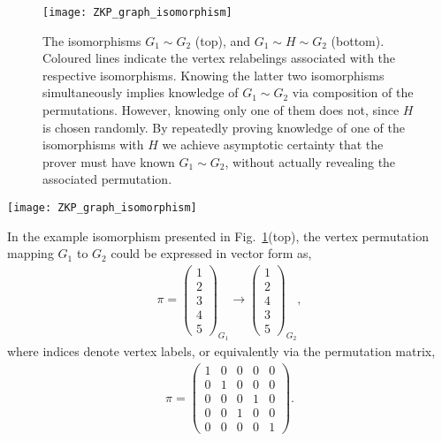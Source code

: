 \pubmode
\begin{figure}[!htpb]
	\texttt{[image: ZKP\_graph\_isomorphism]}
\captionspacefig \caption{The isomorphisms \mbox{$G_1\sim G_2$} (top), and \mbox{$G_1\sim H\sim G_2$} (bottom). Coloured lines indicate the vertex relabelings associated with the respective isomorphisms. Knowing the latter two isomorphisms simultaneously implies knowledge of \mbox{$G_1\sim G_2$} via composition of the permutations. However, knowing only one of them does not, since $H$ is chosen randomly. By repeatedly proving knowledge of one of the isomorphisms with $H$ we achieve asymptotic certainty that the prover must have known \mbox{$G_1\sim G_2$}, without actually revealing the associated permutation.}\label{fig:ZKP_graph}
\end{figure}
\else
\begin{figure*}[!htpb]
	\texttt{[image: ZKP\_graph\_isomorphism]}
\captionspacefig \caption{The isomorphisms \mbox{$G_1\sim G_2$} (top), and \mbox{$G_1\sim H\sim G_2$} (bottom). Coloured lines indicate the vertex relabelings associated with the respective isomorphisms. Knowing the latter two isomorphisms simultaneously implies knowledge of \mbox{$G_1\sim G_2$} via composition of the permutations. However, knowing only one of them does not, since $H$ is chosen randomly. By repeatedly proving knowledge of one of the isomorphisms with $H$ we achieve asymptotic certainty that the prover must have known \mbox{$G_1\sim G_2$}, without actually revealing the associated permutation.}\label{fig:ZKP_graph}
\end{figure*}
\fi

In the example isomorphism presented in Fig.~\ref{fig:ZKP_graph}(top), the vertex permutation mapping $G_1$ to $G_2$ could be expressed in vector form as,
\begin{align}
\pi = \begin{pmatrix}
	1 \\
	2 \\
	3 \\
	4 \\
	5
\end{pmatrix}_{G_1} \to \begin{pmatrix}
	1 \\
	2 \\
	4 \\
	3 \\
	5
\end{pmatrix}_{G_2},
\end{align}
where indices denote vertex labels, or equivalently via the permutation matrix,
\begin{align}
\pi = \begin{pmatrix}
	1 & 0 & 0 & 0 & 0 \\
	0 & 1 & 0 & 0 & 0 \\
	0 & 0 & 0 & 1 & 0 \\
	0 & 0 & 1 & 0 & 0 \\
	0 & 0 & 0 & 0 & 1
\end{pmatrix}.
\end{align}

